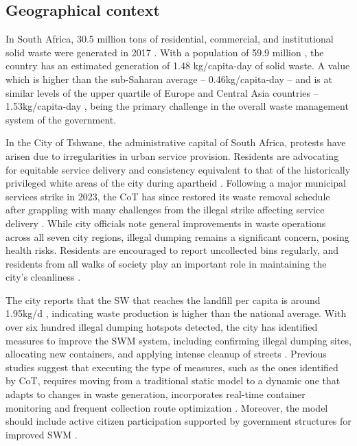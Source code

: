 \documentclass[authoryear,preprint,review,doubleblind, 12pt]{elsarticle}
\begin{document}
    \subsection{Geographical context}
In South Africa, 30.5 million tons of residential, commercial, and institutional solid waste were generated in 2017 \citep{forestryNationalWaste20, departmentofenvironmentalaffairsSouthAfrica18}. With a population of 59.9 million \citep{economicWorldPopulation22}, the country has an estimated generation of 1.48 kg/capita-day of solid waste. A value which is higher than the sub-Saharan average – 0.46kg/capita-day – and is at similar levels of the upper quartile of Europe and Central Asia countries – 1.53kg/capita-day \citep{Kaza2018}, being the primary challenge in the overall waste management system of the government.
    
    In the City of Tshwane, the administrative capital of South Africa, protests have arisen due to irregularities in urban service provision. Residents are advocating for equitable service delivery and consistency equivalent to that of the historically privileged white areas of the city during apartheid \citep{Mokebe2018}. Following a major municipal services strike in 2023, the CoT has since restored its waste removal schedule after grappling with many challenges from the illegal strike affecting service delivery \citep{berlintonCityEmployees23}. While city officials note general improvements in waste operations across all seven city regions, illegal dumping remains a significant concern, posing health risks. Residents are encouraged to report uncollected bins regularly, and residents from all walks of society play an important role in maintaining the city's cleanliness \citep{ramadieCityTshwane23, njiloTshwaneBattles23}. 
   
   The city reports that the SW that reaches the landfill per capita is around 1.95kg/d \citep{tshwaneCityTshwane20222022}, indicating waste production is higher than the national average. With over six hundred illegal dumping hotspots detected, the city has identified measures to improve the SWM system, including confirming illegal dumping sites, allocating new containers, and applying intense cleanup of streets \citep{tshwaneConsolidatedAuditedAnnual2022}. Previous studies suggest that executing the type of measures, such as the ones identified by CoT, requires moving from a traditional static model to a dynamic one that adapts to changes in waste generation, incorporates real-time container monitoring and frequent collection route optimization \citep{Anagnostopoulos2015b, Hina2020, Ramson2022}. Moreover, the model should include active citizen participation supported by government structures for improved SWM \citep{kubanzaSustainableSolidWaste2020}.
\end{document}
